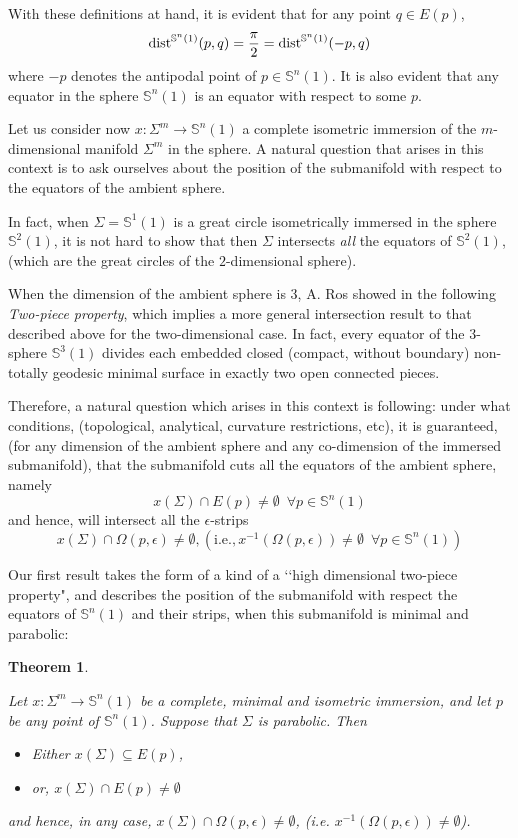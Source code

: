 \documentclass{amsart}
\newtheorem{theorem}{Theorem}[section]
\theoremstyle{definition}
\theoremstyle{remark}
\begin{document}
With these definitions at hand, it is evident that for any point $q\in E(p)$, 
        $$
{\rm dist}^{\mathbb{S}^n(1)}(p,q)=\frac{\pi}{2}={\rm dist}^{\mathbb{S}^n(1)}(-p,q)
        $$
where $-p$ denotes the antipodal point of $p \in \mathbb{S}^{n}(1)$. It is also evident  that any equator in the sphere $\mathbb{S}^n(1)$ is an equator with respect to some $p$.
        
     Let us consider now $x: \Sigma^m \to \mathbb{S}^n(1)$  a complete isometric immersion of the  $m$-dimensional manifold $\Sigma^m$ in the sphere.  A natural question that arises in this context is to ask ourselves about the position of the submanifold with respect to the equators of the ambient sphere. 
     
     In fact, when $\Sigma=\mathbb{S}^{1}(1)$ is a great circle isometrically immersed in the sphere $\mathbb{S}^{2}(1)$, it is not hard to show that then $\Sigma$ intersects {\em all} the equators of $ \mathbb{S}^{2}(1)$, (which are the great circles of the $2$-dimensional sphere).
     
     When the dimension of the ambient sphere is $3$, A. Ros showed in \cite{R} the following {\em Two-piece property}, which implies a more general intersection result to that described above for the two-dimensional case. In fact, every equator of the 3-sphere $\mathbb{S}^3(1)$ divides each embedded closed (compact, without boundary) non-totally geodesic minimal surface in exactly two open connected pieces.
     
    
  Therefore,  a natural question which arises in this context is following: under what conditions, (topological, analytical, curvature restrictions, etc), it is guaranteed, (for any dimension of the ambient sphere and any co-dimension of the immersed submanifold), that the submanifold cuts all the equators of the ambient sphere, namely
        $$x(\Sigma) \cap E(p) \neq \emptyset\,\,\,\forall p \in \mathbb{S}^n(1)$$ and hence, will intersect all the $\epsilon$-strips
        $$x(\Sigma) \cap \Omega(p,\epsilon) \neq \emptyset, (\text{i.e.}, x^{-1}(\Omega(p,\epsilon))\neq \emptyset\,\,\,\forall p \in \mathbb{S}^n(1))$$
   
    Our first result  takes the form of a kind of a \lq\lq high dimensional two-piece property", and describes the position of the submanifold with respect the equators of $\mathbb{S}^n(1)$ and their strips, when this submanifold is minimal and parabolic:
 
\begin{theorem}\label{twopiecegeneral}

Let $x:\Sigma^m \to \mathbb{S}^n(1)$ be a complete,  minimal and isometric immersion, and let $p$ be any point of $\mathbb{S}^n(1)$. Suppose that $\Sigma$ is parabolic. Then
    \begin{itemize}
        \item Either $x(\Sigma)\subseteq E(p)$, 
        \item or, $x(\Sigma)\cap E(p)\neq \emptyset$
            \end{itemize}
            and  hence, in any case,  $x(\Sigma) \cap \Omega(p,\epsilon) \neq \emptyset$, (i.e. $x^{-1}(\Omega(p,\epsilon))\neq \emptyset$).
\end{theorem}
\end{document}
